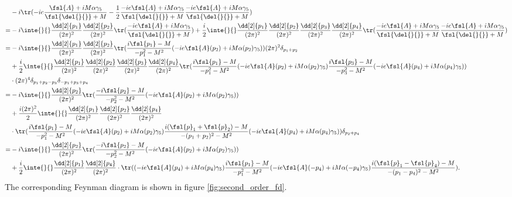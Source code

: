 \begin{align*}
	 &-i\tr(-ie\frac{\fsl{A} + iM\alpha\gamma_{5}}{\fsl{\del{}{}} + M} - \frac{1}{2}\frac{-ie\fsl{A} + iM\alpha\gamma_{5}}{\fsl{\del{}{}} + M}\frac{-ie\fsl{A} + iM\alpha\gamma_{5}}{\fsl{\del{}{}} + M}) \\
	=& -i\inte{}{}\frac{\dd[2]{p_{1}}}{(2\pi)^{2}}\frac{\dd[2]{p_{2}}}{(2\pi)^{2}}\tr(\frac{-ie\fsl{A} + iM\alpha\gamma_{5}}{\fsl{\del{}{}} + M}) + \frac{i}{2}\inte{}{}\frac{\dd[2]{p_{1}}}{(2\pi)^{2}}\frac{\dd[2]{p_{2}}}{(2\pi)^{2}}\frac{\dd[2]{p_{3}}}{(2\pi)^{2}}\frac{\dd[2]{p_{4}}}{(2\pi)^{2}}\tr(\frac{-ie\fsl{A} + iM\alpha\gamma_{5}}{\fsl{\del{}{}} + M}\frac{-ie\fsl{A} + iM\alpha\gamma_{5}}{\fsl{\del{}{}} + M}) \\
	=& -i\inte{}{}\frac{\dd[2]{p_{1}}}{(2\pi)^{2}}\frac{\dd[2]{p_{2}}}{(2\pi)^{2}}\tr(\frac{i\fsl{p_{1}} - M}{-p_{1}^{2} - M^{2}}(-ie\fsl{A}(p_{2}) + iM\alpha(p_{2})\gamma_{5}))(2\pi)^{2}\delta_{p_{1} + p_{2}} \\
	 &+ \frac{i}{2}\inte{}{}\frac{\dd[2]{p_{1}}}{(2\pi)^{2}}\frac{\dd[2]{p_{2}}}{(2\pi)^{2}}\frac{\dd[2]{p_{3}}}{(2\pi)^{2}}\frac{\dd[2]{p_{4}}}{(2\pi)^{2}}\tr(\frac{i\fsl{p_{1}} - M}{-p_{1}^{2} - M^{2}}(-ie\fsl{A}(p_{2}) + iM\alpha(p_{2})\gamma_{5})\frac{i\fsl{p_{3}} - M}{-p_{3}^{2} - M^{2}}(-ie\fsl{A}(p_{4}) + iM\alpha(p_{4})\gamma_{5})) \\
	 &\cdot(2\pi)^{4}\delta_{p_{1} + p_{2} - p_{3}}\delta_{-p_{1} + p_{3} + p_{4}} \\
	=& -i\inte{}{}\frac{\dd[2]{p_{2}}}{(2\pi)^{2}}\tr(\frac{-i\fsl{p_{2}} - M}{-p_{2}^{2} - M^{2}}(-ie\fsl{A}(p_{2}) + iM\alpha(p_{2})\gamma_{5})) \\
	 &+ \frac{i(2\pi)^{2}}{2}\inte{}{}\frac{\dd[2]{p_{1}}}{(2\pi)^{2}}\frac{\dd[2]{p_{2}}}{(2\pi)^{2}}\frac{\dd[2]{p_{4}}}{(2\pi)^{2}} \\
	 &\cdot\tr(\frac{i\fsl{p_{1}} - M}{-p_{1}^{2} - M^{2}}(-ie\fsl{A}(p_{2}) + iM\alpha(p_{2})\gamma_{5})\frac{i(\fsl{p}_{1} + \fsl{p}_{2}) - M}{-(p_{1} + p_{2})^{2} - M^{2}}(-ie\fsl{A}(p_{4}) + iM\alpha(p_{4})\gamma_{5}))\delta_{p_{2} + p_{4}} \\
	=&  -i\inte{}{}\frac{\dd[2]{p_{2}}}{(2\pi)^{2}}\tr(\frac{-i\fsl{p_{2}} - M}{-p_{2}^{2} - M^{2}}(-ie\fsl{A}(p_{2}) + iM\alpha(p_{2})\gamma_{5})) \\
	&+ \frac{i}{2}\inte{}{}\frac{\dd[2]{p_{1}}}{(2\pi)^{2}}\frac{\dd[2]{p_{4}}}{(2\pi)^{2}}\cdot\tr((-ie\fsl{A}(p_{4}) + iM\alpha(p_{4})\gamma_{5})\frac{i\fsl{p_{1}} - M}{-p_{1}^{2} - M^{2}}(-ie\fsl{A}(-p_{4}) + iM\alpha(-p_{4})\gamma_{5})\frac{i(\fsl{p}_{1} - \fsl{p}_{4}) - M}{-(p_{1} - p_{4})^{2} - M^{2}}).
\end{align*}
The corresponding Feynman diagram is shown in figure \ref{fig:second_order_fd}.

